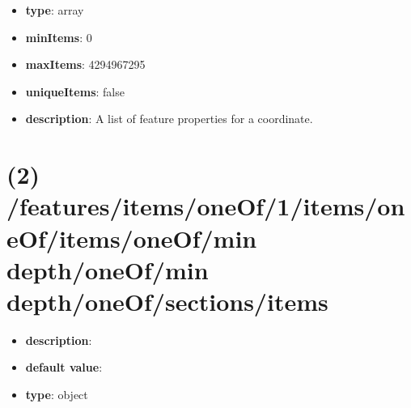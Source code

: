 \begin{itemize}[leftmargin=1em]\item {\bf type}: array
\item {\bf minItems}: 0
\item {\bf maxItems}: 4294967295
\item {\bf uniqueItems}: false
\item {\bf description}: A list of feature properties for a coordinate.
\end{itemize}\section{(2) /features/items/oneOf/1/items/oneOf/items/oneOf/min depth/oneOf/min depth/oneOf/sections/items}
\begin{itemize}[leftmargin=2em]\item {\bf description}: 
\item {\bf default value}: 
\item {\bf type}: object
\end{itemize}

